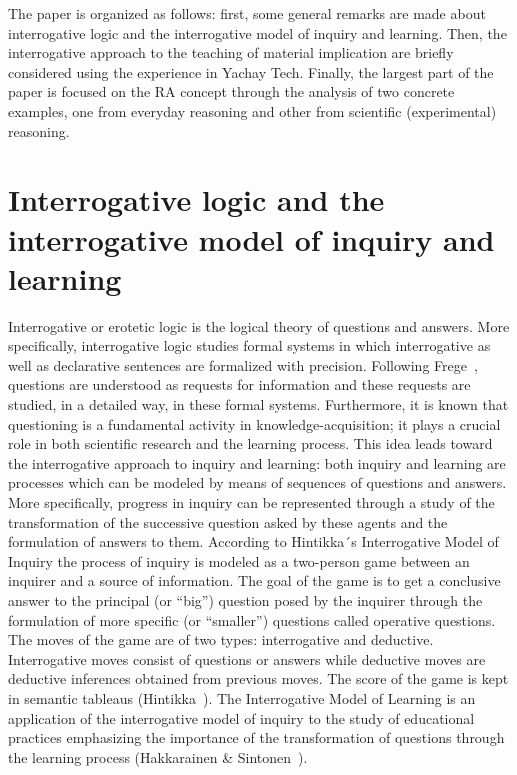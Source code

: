 \documentclass[a4paper,UKenglish]{lipics}
\begin{document}
The paper is organized as follows: first, some general remarks are made about interrogative logic and the interrogative model of inquiry and learning. Then, the interrogative approach to the teaching of material implication are briefly considered using the experience in Yachay Tech. Finally, the largest part of the paper is focused on the RA concept through the analysis of two concrete examples, one from everyday reasoning and other from scientific (experimental) reasoning. 

\section{Interrogative logic and the interrogative model of inquiry and learning}

Interrogative or erotetic logic is the logical theory of questions and answers. More specifically, interrogative logic studies formal systems in which interrogative as well as declarative sentences are formalized with precision. Following Frege~\cite{Frege}, questions are understood as requests for information and these requests are studied, in a detailed way, in these formal systems. Furthermore, it is known that questioning is a fundamental activity in knowledge-acquisition; it plays a crucial role in both scientific research and the learning process. This idea leads toward the interrogative approach to inquiry and learning: both inquiry and learning are processes which can be modeled by means of sequences of questions and answers. More specifically, progress in inquiry can be represented through a study of the transformation of the successive question asked by these agents and the formulation of answers to them. According to Hintikka´s Interrogative Model of Inquiry the process of inquiry is modeled as a two-person game between an inquirer and a source of information. The goal of the game is to get a conclusive answer to the principal (or “big”) question posed by the inquirer through the formulation of more specific (or “smaller”) questions called operative questions. The moves of the game are of two types: interrogative and deductive. Interrogative moves consist of questions or answers while deductive moves are deductive inferences obtained from previous moves. The score of the game is kept in semantic tableaus (Hintikka~\cite{Hintikka}). The Interrogative Model of Learning is an application of the interrogative model of inquiry to the study of educational practices emphasizing the importance of the transformation of questions through the learning process (Hakkarainen \& Sintonen~\cite{HakkarainenAndSintonen}).
 
\end{document}
